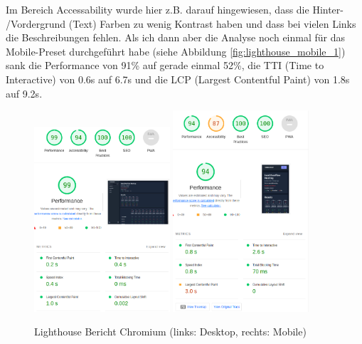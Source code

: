 Im Bereich Accessability wurde hier z.B. darauf hingewiesen, dass die Hinter- /Vordergrund (Text) Farben zu wenig Kontrast haben und dass bei vielen Links die Beschreibungen fehlen. Als ich dann aber die Analyse noch einmal für das Mobile-Preset durchgeführt habe (siehe Abbildung \ref{fig:lighthouse_mobile_1}) 
sank die Performance von 91\% auf gerade einmal 52\%, die TTI (Time to Interactive) von 0.6s auf 6.7s und die LCP (Largest Contentful Paint) von 1.8s auf 9.2s.

\begin{figure}[th]
    \centering
    \includegraphics[width=0.45\textwidth]{Figures/lighthouse_desktop_4.png}
    \includegraphics[width=0.45\textwidth]{Figures/lighthouse_mobile_2.png}
    \decoRule
    \caption[Turbomeet Lighthouse Bericht Chromium]{Lighthouse Bericht Chromium (links: Desktop, rechts: Mobile)}
    \label{fig:lighthouse_mobile_2}
\end{figure}

